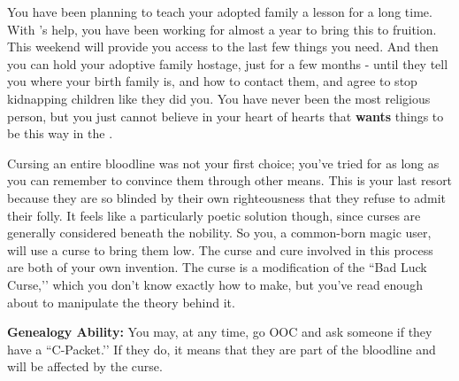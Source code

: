\documentclass[green]{GL2020}
\begin{document}
\name{\gPunishKidnappers{}}

You have been planning to teach your adopted family a lesson for a long time. With \cLibAssist{\full}’s help, you have been working for almost a year to bring this to fruition. This weekend will provide you access to the last few things you need. And then you can hold your adoptive family hostage, just for a few months - until they tell you where your birth family is, and how to contact them, and agree to stop kidnapping children like they did you. You have never been the most religious person, but you just cannot believe in your heart of hearts that \cFarmGod{} \textbf{wants} things to be this way in the \pFarm{}.

Cursing an entire bloodline was not your first choice; you’ve tried for as long as you can remember to convince them through other means. This is your last resort because they are so blinded by their own righteousness that they refuse to admit their folly. It feels like a particularly poetic solution though, since curses are generally considered beneath the nobility. So you, a common-born magic user, will use a curse to bring them low. The curse and cure involved in this process are both of your own invention. The curse is a modification of the ``Bad Luck Curse,’’ which you don’t know exactly how to make, but you’ve read enough about to manipulate the theory behind it.

\textbf{Genealogy Ability:} You may, at any time, go OOC and ask someone if they have a ``C-Packet.’’ If they do, it means that they are part of the \cAdopted{\formal} bloodline and will be affected by the curse.
\end{document}
